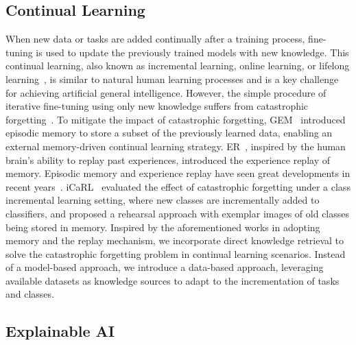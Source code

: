 \documentclass[runningheads]{llncs}
\begin{document}
\subsection{Continual Learning}
\label{sec:rw_increment}

When new data or tasks are added continually after a training process,
fine-tuning is used to update the previously trained models with new knowledge. 
This continual learning, also known as incremental learning, online learning, or lifelong learning~\cite{SurveyIncLearn,SurveyOnlineLearn}, is similar to natural human learning processes 
and is a key challenge for achieving artificial general intelligence.
However, the simple procedure of iterative fine-tuning using only new knowledge suffers from catastrophic forgetting~\cite{cataforget,SurveyIncLearn}.
To mitigate the impact of catastrophic forgetting, 
GEM~\cite{GEM} introduced episodic memory to store a subset of the previously learned data,
enabling an external memory-driven continual learning strategy.
ER~\cite{ER}, inspired by the human brain's ability to replay past experiences, introduced the experience replay of memory.
Episodic memory and experience replay have seen great developments in recent years~\cite{AGEM,ERTrick,HAL}. 
iCaRL~\cite{iCaRL} evaluated the effect of catastrophic forgetting under a class incremental learning setting,
where new classes are incrementally added to classifiers, 
and proposed a rehearsal approach with exemplar images of old classes being stored in memory. 
Inspired by the aforementioned works in adopting memory and the replay mechanism, we incorporate direct knowledge 
retrieval to solve the catastrophic forgetting problem in continual learning scenarios. Instead of a model-based approach, we introduce 
a data-based approach, leveraging available datasets as knowledge sources to adapt to the incrementation of tasks and classes.


\subsection{Explainable AI}
\label{sec:rw_explainable}
\end{document}
